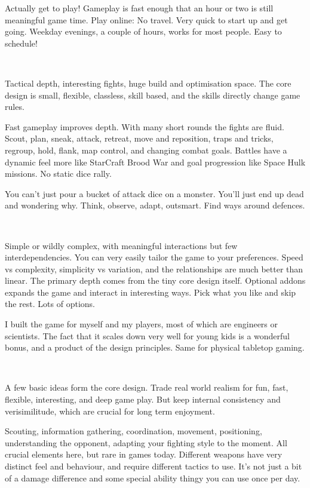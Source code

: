 \noindent
Actually get to play! Gameplay is fast enough that an hour or two is still meaningful game time. Play online: No travel. Very quick to start up and get going. Weekday evenings, a couple of hours, works for most people. Easy to schedule!

\

\noindent
Tactical depth, interesting fights, huge build and optimisation space. The core design is small, flexible, classless, skill based, and the skills directly change game rules.

Fast gameplay improves depth. With many short rounds the fights are fluid. Scout, plan, sneak, attack, retreat, move and reposition, traps and tricks, regroup, hold, flank, map control, and changing combat goals. 
Battles have a dynamic feel more like StarCraft Brood War and goal progression like Space Hulk missions. No static dice rally.

You can't just pour a bucket of attack dice on a monster. You'll just end up dead and wondering why. Think, observe, adapt, outsmart. Find ways around defences.

\

\noindent
Simple or wildly complex, with meaningful interactions but few interdependencies. You can very easily tailor the game to your preferences. Speed vs complexity, simplicity vs variation, and the relationships are much better than linear. The primary depth comes from the tiny core design itself. Optional addons expands the game and interact in interesting ways. Pick what you like and skip the rest. Lots of options.

I built the game for myself and my players, most of which are engineers or scientists. The fact that it scales down very well for young kids is a wonderful bonus, and a product of the design principles. Same for physical tabletop gaming.

\

\noindent
A few basic ideas form the core design. Trade real world realism for fun, fast, flexible, interesting, and deep game play. But keep internal consistency and verisimilitude, which are crucial for long term enjoyment.

Scouting, information gathering, coordination, movement, positioning, understanding the opponent, adapting your fighting style to the moment. All crucial elements here, but rare in games today. Different weapons have very distinct feel and behaviour, and require different tactics to use. It's not just a bit of a damage difference and some special ability thingy you can use once per day. 





